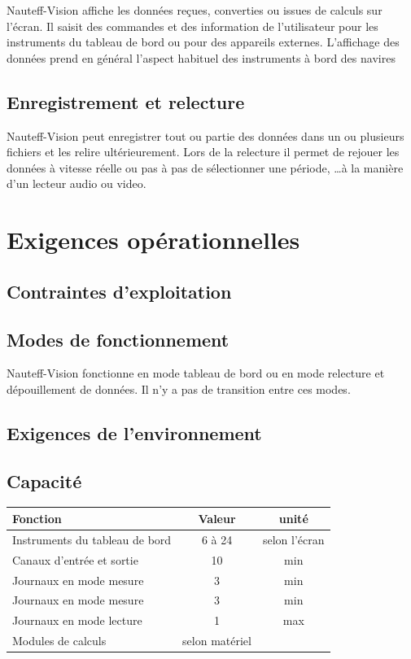 \documentclass[a4paper,11pt]{report}
\begin{document}
Nauteff-Vision affiche les données reçues,
converties ou issues de calculs sur l'écran.
Il saisit des commandes et des information de l'utilisateur
pour les instruments du tableau de bord ou pour des appareils externes.
\newline
L'affichage des données prend en général l'aspect habituel
des instruments à bord des navires

\subsection{Enregistrement et relecture}

Nauteff-Vision peut enregistrer tout ou partie des données
dans un ou plusieurs fichiers et les relire ultérieurement.
Lors de la relecture il permet de rejouer les données à vitesse réelle
ou pas à pas de sélectionner une période, \ldots à la manière d'un lecteur
audio ou video.

\section{Exigences opérationnelles}
\subsection{Contraintes d'exploitation}
\subsection{Modes de fonctionnement}
Nauteff-Vision fonctionne en mode tableau de bord
ou en mode relecture et dépouillement de données.
Il n'y a pas de transition entre ces modes.

\subsection{Exigences de l'environnement}
\subsection{Capacité}

\begin{tabular}{|l|c|c|}
	\hline
    Fonction & Valeur &  unité\\
	\hline
    Instruments du tableau de bord & 6 à 24 &  selon l'écran\\
	\hline
    Canaux d'entrée et sortie & 10 & min\\
    \hline
    Journaux en mode mesure & 3 & min\\
    \hline
    Journaux en mode mesure & 3 & min \\
    \hline
    Journaux en mode lecture & 1 & max\\
    \hline
    Modules de calculs & selon matériel  & \\
    \hline
\end{tabular}
\\
\end{document}
